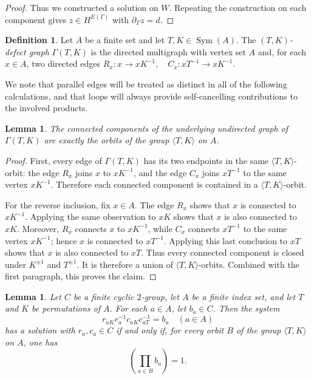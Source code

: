 \documentclass[11pt]{article}
\theoremstyle{plain}
\newtheorem{lemma}[theorem]{Lemma}
\theoremstyle{remark}
\theoremstyle{definition}
\newtheorem{definition}[theorem]{Definition}
\theoremstyle{plain}
\begin{document}
\begin{proof}
Thus we constructed a solution on $W$. Repeating the construction on each
component gives $z\in H^{E(\Gamma)}$ with $\partial_\Gamma z=d$.
\end{proof}

\begin{definition}\label{d:defect-graph}
Let $A$ be a finite set and let $T,K\in\operatorname{Sym}(A)$. The
\emph{$(T,K)$-defect graph} $\Gamma(T,K)$ is the directed multigraph with
vertex set $A$ and, for each $x\in A$, two directed edges
\(R_x\colon x\longrightarrow xK^{-1}, \quad C_x\colon xT^{-1}\longrightarrow xK^{-1}.\)
\end{definition}
We note that parallel edges will be treated as distinct in all of the following calculations, and that loops will always provide self-cancelling contributions to the involved products.

\begin{lemma}\label{l:defect-graph-components}
The connected components of the underlying undirected graph of $\Gamma(T,K)$ are exactly the orbits of the group
$\langle T,K\rangle$ on $A$.
\end{lemma}

\begin{proof}
First, every edge of $\Gamma(T,K)$ has its two endpoints in the same
$\langle T,K\rangle$-orbit: the edge $R_x$ joins $x$ to $xK^{-1}$, and the edge
$C_x$ joins $xT^{-1}$ to the same vertex $xK^{-1}$. Therefore each connected
component is contained in a $\langle T,K\rangle$-orbit.

For the reverse inclusion, fix $x\in A$. The edge $R_x$ shows that $x$ is
connected to $xK^{-1}$. Applying the same observation to $xK$ shows that $x$
is also connected to $xK$. Moreover, $R_x$ connects $x$ to $xK^{-1}$, while
$C_x$ connects $xT^{-1}$ to the same vertex $xK^{-1}$; hence $x$ is connected
to $xT^{-1}$. Applying this last conclusion to $xT$ shows that $x$ is also
connected to $xT$. Thus every connected component is closed under $K^{\pm1}$
and $T^{\pm1}$. It is therefore a union of $\langle T,K\rangle$-orbits.
Combined with the first paragraph, this proves the claim.
\end{proof}

\begin{lemma}\label{l:defect-equations}
Let $C$ be a finite cyclic $2$-group, let $A$ be a finite index set, and let $T$ and
$K$ be permutations of $A$. For each $a\in A$, let $b_a\in C$. Then the
system
\begin{equation}\label{eq:defect-equation-system}
        r_{aK}r_a^{-1}c_{aK}c_{aT}^{-1}=b_a
        \quad (a\in A)
\end{equation}
has a solution with $r_a,c_a\in C$ if and only if, for every orbit $B$ of the
group $\langle T,K\rangle$ on $A$, one has
\[
        \left(\prod_{a\in B} b_a\right)=1.
\]
\end{lemma}
\end{document}
